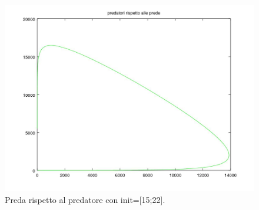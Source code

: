 \documentclass[11pt,a4paper,twoside,openright,titlepage,
headinclude,footinclude,BCOR5mm,
numbers=noenddot,cleardoublepage=empty,
tablecaptionabove]{scrbook}
\begin{document}
\begin{center}
\begin{figure}[t!]
\includegraphics[width=\textwidth]{figs/predatore_preda_15.jpg}
\caption{Preda rispetto al predatore con init=[15;22].}
\end{figure}
\end{center}

\newpage
\end{document}
